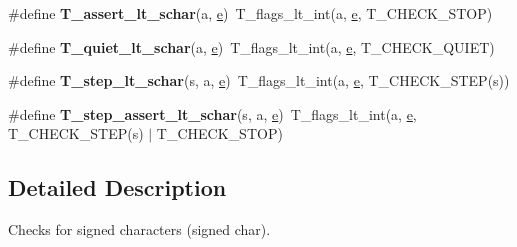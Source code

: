\begin{DoxyCompactItemize}
\item 
\mbox{\label{group__RTEMSTestFrameworkChecksSChar_ga6fe747a370d3d5681af7b7a16611a2a3}} 
\#define {\bfseries T\+\_\+assert\+\_\+lt\+\_\+schar}(a,  \mbox{\hyperlink{sun4u_2tte_8h_a8b0b9ed08e0e18920ec2682f48228c27}{e}})~T\+\_\+flags\+\_\+lt\+\_\+int(a, \mbox{\hyperlink{sun4u_2tte_8h_a8b0b9ed08e0e18920ec2682f48228c27}{e}}, T\+\_\+\+C\+H\+E\+C\+K\+\_\+\+S\+T\+OP)
\item 
\mbox{\label{group__RTEMSTestFrameworkChecksSChar_ga123e66a72989dec1c345a5084ce24880}} 
\#define {\bfseries T\+\_\+quiet\+\_\+lt\+\_\+schar}(a,  \mbox{\hyperlink{sun4u_2tte_8h_a8b0b9ed08e0e18920ec2682f48228c27}{e}})~T\+\_\+flags\+\_\+lt\+\_\+int(a, \mbox{\hyperlink{sun4u_2tte_8h_a8b0b9ed08e0e18920ec2682f48228c27}{e}}, T\+\_\+\+C\+H\+E\+C\+K\+\_\+\+Q\+U\+I\+ET)
\item 
\mbox{\label{group__RTEMSTestFrameworkChecksSChar_gac21c50fa43504982b113f2a2b3f18a40}} 
\#define {\bfseries T\+\_\+step\+\_\+lt\+\_\+schar}(s,  a,  \mbox{\hyperlink{sun4u_2tte_8h_a8b0b9ed08e0e18920ec2682f48228c27}{e}})~T\+\_\+flags\+\_\+lt\+\_\+int(a, \mbox{\hyperlink{sun4u_2tte_8h_a8b0b9ed08e0e18920ec2682f48228c27}{e}}, T\+\_\+\+C\+H\+E\+C\+K\+\_\+\+S\+T\+EP(s))
\item 
\mbox{\label{group__RTEMSTestFrameworkChecksSChar_gae6c4fee28bb4d1dae9110754ca86d050}} 
\#define {\bfseries T\+\_\+step\+\_\+assert\+\_\+lt\+\_\+schar}(s,  a,  \mbox{\hyperlink{sun4u_2tte_8h_a8b0b9ed08e0e18920ec2682f48228c27}{e}})~T\+\_\+flags\+\_\+lt\+\_\+int(a, \mbox{\hyperlink{sun4u_2tte_8h_a8b0b9ed08e0e18920ec2682f48228c27}{e}}, T\+\_\+\+C\+H\+E\+C\+K\+\_\+\+S\+T\+EP(s) $\vert$ T\+\_\+\+C\+H\+E\+C\+K\+\_\+\+S\+T\+OP)
\end{DoxyCompactItemize}


\subsection{Detailed Description}
Checks for signed characters (signed char). 

